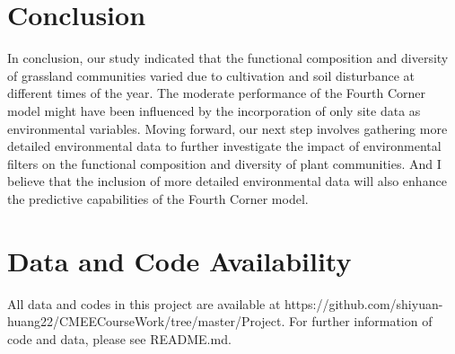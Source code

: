 \documentclass[a4paper, 11, margin=2cm]{article}
\begin{document}
    \section{Conclusion}

    In conclusion, our study indicated that the functional composition and diversity of grassland communities varied due to cultivation and soil disturbance at different times of the year. The moderate performance of the Fourth Corner model might have been influenced by the incorporation of only site data as environmental variables. Moving forward, our next step involves gathering more detailed environmental data to further investigate the impact of environmental filters on the functional composition and diversity of plant communities. And I believe that the inclusion of more detailed environmental data will also enhance the predictive capabilities of the Fourth Corner model.

    \section{Data and Code Availability}

    All data and codes in this project are available at https://github.com/shiyuan-huang22/CMEECourseWork/tree/master/Project. For further information of code and data, please see README.md.

    

    
  
  
  
\end{document}
